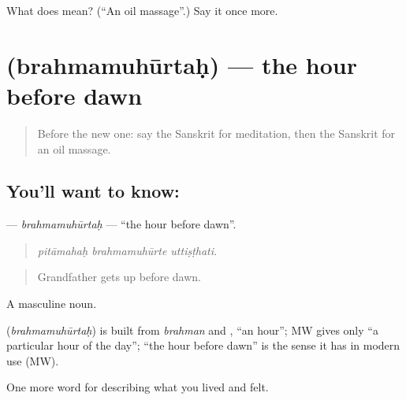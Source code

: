 \begin{tcolorbox}[breakable,colback=teal!4,colframe=teal!35!black,title={Before you move on}]
What does  mean? (\textquotedblleft{}An oil massage\textquotedblright{}.) Say it once more.
\end{tcolorbox}
\section[\texorpdfstring{\sk{ब्रह्ममुहूर्तः} (brahmamuhūrtaḥ)}{ब्रह्ममुहूर्तः (brahmamuhūrtaḥ)}]{ (brahmamuhūrtaḥ) — the hour before dawn}

\label{lesson:SA-C486-brahmamuhurtah}



\begin{quote}
Before the new one: say the Sanskrit for meditation, then the Sanskrit for an oil massage.
\end{quote}

\subsection*{You'll want to know: }
\textbf{} — \emph{brahmamuhūrtaḥ} — \textquotedblleft{}the hour before dawn\textquotedblright{}.

\begin{quote}
  
\end{quote}

\begin{quote}
\emph{pitāmahaḥ brahmamuhūrte uttiṣṭhati.}
\end{quote}

\begin{quote}
Grandfather gets up before dawn.
\end{quote}

A masculine noun.

\begin{cousinweb}
\textbf{} (\emph{brahmamuhūrtaḥ}) is built from \emph{brahman} and \textbf{}, \textquotedblleft{}an hour\textquotedblright{}; MW gives only \textquotedblleft{}a particular hour of the day\textquotedblright{}; \textquotedblleft{}the hour before dawn\textquotedblright{} is the sense it has in modern use (MW).
\end{cousinweb}

\begin{grammarlens}[title={What you've built}]
One more word for describing what you lived and felt.
\end{grammarlens}

